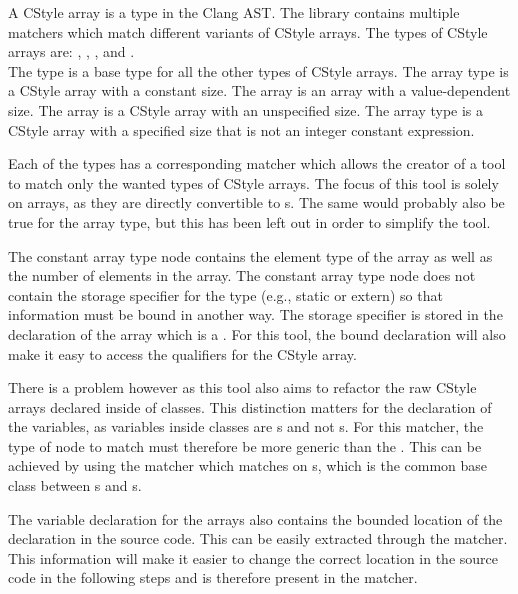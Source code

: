 A CStyle array is a type in the Clang AST. The library contains multiple matchers which match different variants of CStyle arrays. The types of CStyle arrays are: , , ,  and . \\
The  type is a base type for all the other types of CStyle arrays. The  array type is a CStyle array with a constant size. The  array is an array with a value-dependent size. The  array is a CStyle array with an unspecified size. The  array type is a CStyle array with a specified size that is not an integer constant expression.

Each of the types has a corresponding matcher which allows the creator of a tool to match only the wanted types of CStyle arrays. The focus of this tool is solely on  arrays, as they are directly convertible to s. The same would probably also be true for the  array type, but this has been left out in order to simplify the tool.

The constant array type node contains the element type of the array as well as the number of elements in the array. The constant array type node does not contain the storage specifier for the type (e.g., static or extern) so that information must be bound in another way. The storage specifier is stored in the declaration of the array which is a . For this tool, the bound declaration will also make it easy to access the qualifiers for the CStyle array. 

There is a problem however as this tool also aims to refactor the raw CStyle arrays declared inside of classes. This distinction matters for the declaration of the variables, as variables inside classes are s and not s. For this matcher, the type of node to match must therefore be more generic than the . This can be achieved by using the  matcher which matches on s, which is the common base class between s and s.

The variable declaration for the arrays also contains the bounded location of the declaration in the source code. This can be easily extracted through the  matcher. This information will make it easier to change the correct location in the source code in the following steps and is therefore present in the matcher.

